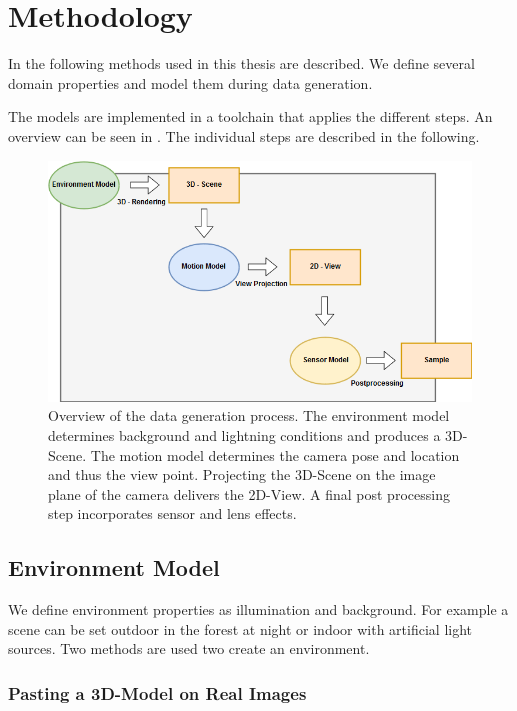 \section{Methodology}
\label{sec:training:meth}

In the following methods used in this thesis are described. We define several domain properties and model them during data generation.

The models are implemented in a toolchain that applies the different steps. An overview can be seen in  . The individual steps are described in the following.

\begin{figure}
	\centering
	\includegraphics[width=\textwidth]{fig/Toolchain_datagen}
	\caption{Overview of the data generation process. The environment model determines background and lightning conditions and produces a 3D-Scene. The motion model determines the camera pose and location and thus the view point. Projecting the 3D-Scene on the image plane of the camera delivers the 2D-View. A final post processing step incorporates sensor and lens effects.}
	\label{fig:training:toolchain_datagen}
\end{figure}

\subsection{Environment Model}
\label{sec:training:scene}
We define environment properties as illumination and background. For example a scene can be set outdoor in the forest at night or indoor with artificial light sources. Two methods are used two create an environment.

\subsubsection{Pasting a 3D-Model on Real Images}

